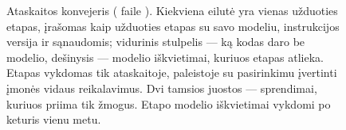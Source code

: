 \begin{figure}[p]
\actorlegend
\caption{Ataskaitos konvejeris ( faile ). Kiekviena
eilutė yra vienas užduoties  etapas, įrašomas kaip užduoties etapas su
savo modeliu, instrukcijos versija ir sąnaudomis; vidurinis stulpelis --- ką kodas daro be
modelio, dešinysis --- modelio iškvietimai, kuriuos etapas atlieka. Etapas 
vykdomas tik ataskaitoje, paleistoje su pasirinkimu įvertinti įmonės vidaus reikalavimus. Dvi
tamsios juostos --- sprendimai, kuriuos priima tik žmogus. Etapo modelio iškvietimai vykdomi po
keturis vienu metu.}\label{fig:report:pipeline}
\end{figure}

